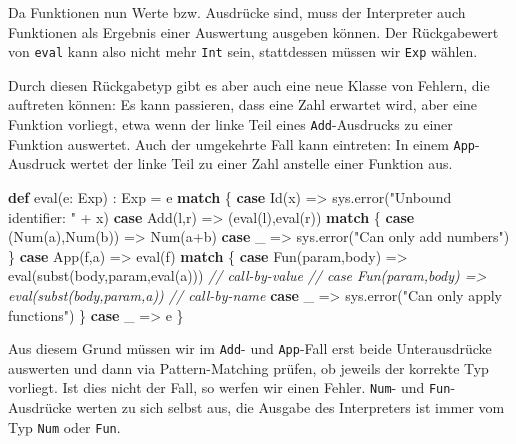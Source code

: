 \documentclass[]{article}
\newenvironment{Shaded}{}{}
\newcommand{\CommentTok}[1]{\textcolor[rgb]{0.38,0.63,0.69}{\textit{#1}}}
\newcommand{\FunctionTok}[1]{\textcolor[rgb]{0.02,0.16,0.49}{#1}}
\newcommand{\KeywordTok}[1]{\textcolor[rgb]{0.00,0.44,0.13}{\textbf{#1}}}
\newcommand{\NormalTok}[1]{#1}
\newcommand{\StringTok}[1]{\textcolor[rgb]{0.25,0.44,0.63}{#1}}
\begin{document}
Da Funktionen nun Werte bzw. Ausdrücke sind, muss der Interpreter auch
Funktionen als Ergebnis einer Auswertung ausgeben können. Der
Rückgabewert von \texttt{eval} kann also nicht mehr \texttt{Int} sein,
stattdessen müssen wir \texttt{Exp} wählen.

Durch diesen Rückgabetyp gibt es aber auch eine neue Klasse von Fehlern,
die auftreten können: Es kann passieren, dass eine Zahl erwartet wird,
aber eine Funktion vorliegt, etwa wenn der linke Teil eines
\texttt{Add}-Ausdrucks zu einer Funktion auswertet. Auch der umgekehrte
Fall kann eintreten: In einem \texttt{App}-Ausdruck wertet der linke
Teil zu einer Zahl anstelle einer Funktion aus.

\begin{Shaded}
\begin{Highlighting}[]
\KeywordTok{def} \FunctionTok{eval}\NormalTok{(e: Exp) : Exp = e }\KeywordTok{match}\NormalTok{ \{}
  \KeywordTok{case} \FunctionTok{Id}\NormalTok{(x) =\textgreater{} sys.}\FunctionTok{error}\NormalTok{(}\StringTok{"Unbound identifier: "}\NormalTok{ + x)}
  \KeywordTok{case} \FunctionTok{Add}\NormalTok{(l,r) =\textgreater{} (}\FunctionTok{eval}\NormalTok{(l),}\FunctionTok{eval}\NormalTok{(r)) }\KeywordTok{match}\NormalTok{ \{}
    \KeywordTok{case}\NormalTok{ (}\FunctionTok{Num}\NormalTok{(a),}\FunctionTok{Num}\NormalTok{(b)) =\textgreater{} }\FunctionTok{Num}\NormalTok{(a+b)}
    \KeywordTok{case}\NormalTok{ \_ =\textgreater{} sys.}\FunctionTok{error}\NormalTok{(}\StringTok{"Can only add numbers"}\NormalTok{)}
\NormalTok{  \}}
  \KeywordTok{case} \FunctionTok{App}\NormalTok{(f,a) =\textgreater{} }\FunctionTok{eval}\NormalTok{(f) }\KeywordTok{match}\NormalTok{ \{}
    \KeywordTok{case} \FunctionTok{Fun}\NormalTok{(param,body) =\textgreater{} }\FunctionTok{eval}\NormalTok{(}\FunctionTok{subst}\NormalTok{(body,param,}\FunctionTok{eval}\NormalTok{(a))) }\CommentTok{// call{-}by{-}value}
    \CommentTok{// case Fun(param,body) =\textgreater{} eval(subst(body,param,a))    // call{-}by{-}name}
    \KeywordTok{case}\NormalTok{ \_ =\textgreater{} sys.}\FunctionTok{error}\NormalTok{(}\StringTok{"Can only apply functions"}\NormalTok{)}
\NormalTok{  \}}
  \KeywordTok{case}\NormalTok{ \_ =\textgreater{} e}
\NormalTok{\}}
\end{Highlighting}
\end{Shaded}

Aus diesem Grund müssen wir im \texttt{Add}- und \texttt{App}-Fall erst
beide Unterausdrücke auswerten und dann via Pattern-Matching prüfen, ob
jeweils der korrekte Typ vorliegt. Ist dies nicht der Fall, so werfen
wir einen Fehler. \texttt{Num}- und \texttt{Fun}-Ausdrücke werten zu
sich selbst aus, die Ausgabe des Interpreters ist immer vom Typ
\texttt{Num} oder \texttt{Fun}.
\end{document}
